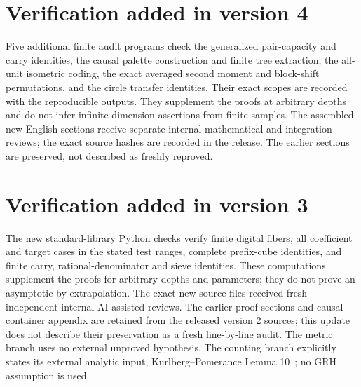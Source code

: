 \documentclass[11pt]{article}
\theoremstyle{definition}
\theoremstyle{remark}
\begin{document}
\section*{Verification added in version 4}
Five additional finite audit programs check the generalized pair-capacity
and carry identities, the causal palette construction and finite tree
extraction, the all-unit isometric coding, the exact averaged second
moment and block-shift permutations, and the circle transfer identities.
Their exact scopes are recorded with the reproducible outputs.
They supplement the proofs at arbitrary depths and do not infer
infinite dimension assertions from finite samples. The assembled new
English sections receive separate internal mathematical and integration
reviews; the exact source hashes are recorded in the release.
The earlier sections are preserved, not described as freshly reproved.

\section*{Verification added in version 3}
The new standard-library Python checks verify finite digital fibers,
all coefficient and target cases in the stated test ranges, complete
prefix-cube identities, and finite carry, rational-denominator and sieve
identities. These computations supplement the proofs for arbitrary
depths and parameters; they do not prove an asymptotic by extrapolation.
The exact new source files received fresh independent internal
AI-assisted reviews. The earlier proof sections and causal-container
appendix are retained from the released version 2 sources; this update
does not describe their preservation as a fresh line-by-line audit.
The metric branch uses no external unproved hypothesis. The counting
branch explicitly states its external analytic input,
Kurlberg--Pomerance Lemma 10~\cite{KP2005}; no GRH assumption is used.
\end{document}
